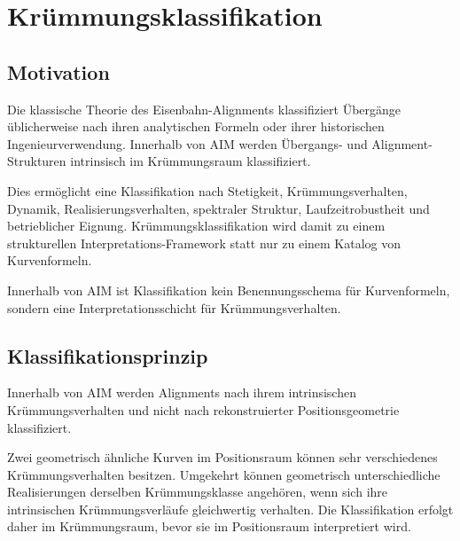 
\chapter{Krümmungsklassifikation}
\label{chap:curvature-classification}

\section*{Motivation}

Die klassische Theorie des Eisenbahn-Alignments klassifiziert Übergänge
üblicherweise nach ihren analytischen Formeln oder ihrer historischen
Ingenieurverwendung. Innerhalb von AIM werden Übergangs- und
Alignment-Strukturen intrinsisch im Krümmungsraum klassifiziert.

Dies ermöglicht eine Klassifikation nach Stetigkeit, Krümmungsverhalten,
Dynamik, Realisierungsverhalten, spektraler Struktur, Laufzeitrobustheit und
betrieblicher Eignung. Krümmungsklassifikation wird damit zu einem
strukturellen Interpretations-Framework statt nur zu einem Katalog von
Kurvenformeln.

\begin{principle}
\label{princ:classification-as-interpretation}
Innerhalb von AIM ist Klassifikation kein Benennungsschema für Kurvenformeln,
sondern eine Interpretationsschicht für Krümmungsverhalten.
\end{principle}

\section{Klassifikationsprinzip}

\begin{principle}
\label{princ:intrinsic-classification}
Innerhalb von AIM werden Alignments nach ihrem intrinsischen
Krümmungsverhalten und nicht nach rekonstruierter Positionsgeometrie
klassifiziert.
\end{principle}

Zwei geometrisch ähnliche Kurven im Positionsraum können sehr verschiedenes
Krümmungsverhalten besitzen. Umgekehrt können geometrisch unterschiedliche
Realisierungen derselben Krümmungsklasse angehören, wenn sich ihre
intrinsischen Krümmungsverläufe gleichwertig verhalten. Die Klassifikation
erfolgt daher im Krümmungsraum, bevor sie im Positionsraum interpretiert wird.

